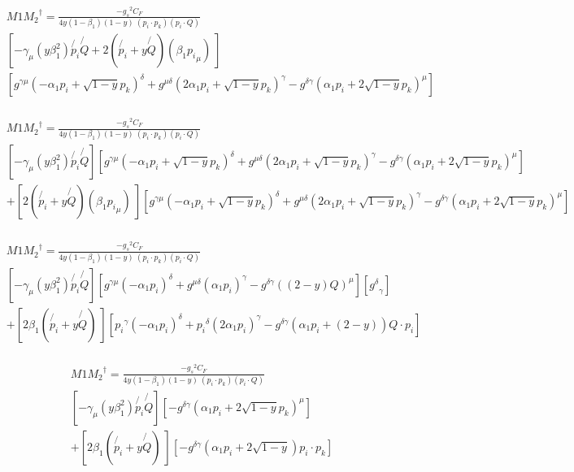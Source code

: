 \begin{equation}
\begin{split}
&M1{M_2}^{\dagger}=\frac{-{g_s}^2 C_F}{4 y(1-\beta_1) (1-y)\:(p_i \cdot p_k)(p_i \cdot Q)}\\
&[-\gamma_{\mu}(y\beta_1^2)\not{p_i}\not{Q}+2(\not{p_i}+y\not{Q})(\beta_1{p_i}_{\mu})\:]\\
&[ g^{{{\gamma}}{{\mu}}}(-\alpha_1p_i+\sqrt{1-y} p_k)^{\delta}+g^{{{\mu}}{{\delta}}}(2\alpha_1p_i+ \sqrt{1-y} p_k)^{{\gamma}}-g^{\delta{{\gamma}}}(\alpha_1p_i+2\sqrt{1-y} p_k)^{{\mu}}]\\
\end{split}
\end{equation}

\begin{equation}
\begin{split}
&M1{M_2}^{\dagger}=\frac{-{g_s}^2 C_F}{4 y(1-\beta_1) (1-y)\:(p_i \cdot p_k)(p_i \cdot Q)}\\
&[-\gamma_{\mu}(y\beta_1^2)\not{p_i}\not{Q}][ g^{{{\gamma}}{{\mu}}}(-\alpha_1p_i+\sqrt{1-y} p_k)^{\delta}+g^{{{\mu}}{{\delta}}}(2\alpha_1p_i+ \sqrt{1-y} p_k)^{{\gamma}}-g^{\delta{{\gamma}}}(\alpha_1p_i+2\sqrt{1-y} p_k)^{{\mu}}]\\
&+[2(\not{p_i}+y\not{Q})(\beta_1{p_i}_{\mu})\:][ g^{{{\gamma}}{{\mu}}}(-\alpha_1p_i+\sqrt{1-y} p_k)^{\delta}+g^{{{\mu}}{{\delta}}}(2\alpha_1p_i+ \sqrt{1-y} p_k)^{{\gamma}}-g^{\delta{{\gamma}}}(\alpha_1p_i+2\sqrt{1-y} p_k)^{{\mu}}]\\
\end{split}
\end{equation}

\begin{equation}
\begin{split}
&M1{M_2}^{\dagger}=\frac{-{g_s}^2 C_F}{4 y(1-\beta_1) (1-y)\:(p_i \cdot p_k)(p_i \cdot Q)}\\
&[-\gamma_{\mu}(y\beta_1^2)\not{p_i}\not{Q}][ g^{{{\gamma}}{{\mu}}}(-\alpha_1p_i)^{\delta}+g^{{{\mu}}{{\delta}}}(\alpha_1p_i )^{{\gamma}}-g^{\delta{{\gamma}}}((2-y)Q)^{{\mu}}][{g^{\delta}}_{\gamma}]\\
&+[2\beta_1(\not{p_i}+y\not{Q})\:][{p_i}^{\gamma} (-\alpha_1p_i)^{\delta}+{p_i}^{\delta}(2\alpha_1p_i )^{{\gamma}}-g^{\delta{{\gamma}}}(\alpha_1p_i+(2-y))Q\cdot p_i]\\
\end{split}
\end{equation}

\begin{equation}
\begin{split}
&M1{M_2}^{\dagger}=\frac{-{g_s}^2 C_F}{4 y(1-\beta_1) (1-y)\:(p_i \cdot p_k)(p_i \cdot Q)}\\
&[-\gamma_{\mu}(y\beta_1^2)\not{p_i}\not{Q}][-g^{\delta{{\gamma}}}(\alpha_1p_i+2\sqrt{1-y} p_k)^{{\mu}}]\\
&+[2\beta_1(\not{p_i}+y\not{Q})\:][-g^{\delta{{\gamma}}}(\alpha_1p_i+2\sqrt{1-y})p_i\cdot p_k]\\
\end{split}
\end{equation}

